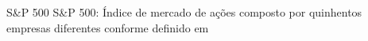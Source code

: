 \begin{siglas}
    \item[S\&P 500] S\&P 500: Índice de mercado de ações composto por
                    quinhentos empresas diferentes conforme definido
                    em 
\end{siglas}

